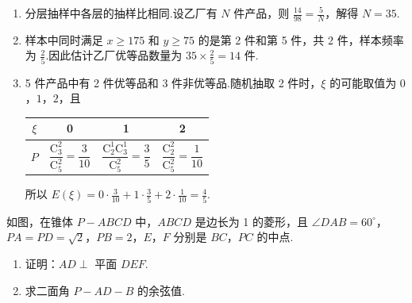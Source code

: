 \begin{solution}
\begin{enumerate}
\item 分层抽样中各层的抽样比相同.设乙厂有 \(N\) 件产品，则 \(\frac{14}{98}=\frac{5}{N}\)，解得 \(N=35\).
\item 样本中同时满足 \(x\geqslant175\) 和 \(y\geqslant75\) 的是第 2 件和第 5 件，共 2 件，样本频率为 \(\frac25\).因此估计乙厂优等品数量为 \(35\times\frac25=14\) 件.
\item 5 件产品中有 2 件优等品和 3 件非优等品.随机抽取 2 件时，\(\xi\) 的可能取值为 \(0\)，\(1\)，\(2\)，且
\begin{center}
\begin{tabular}{c|ccc}
\hline
\(\xi\) & 0 & 1 & 2 \\
\hline
\(P\) & \(\dfrac{\mathrm C_3^2}{\mathrm C_5^2}=\dfrac3{10}\) & \(\dfrac{\mathrm C_2^1\mathrm C_3^1}{\mathrm C_5^2}=\dfrac35\) & \(\dfrac{\mathrm C_2^2}{\mathrm C_5^2}=\dfrac1{10}\) \\
\hline
\end{tabular}
\end{center}
所以 \(E(\xi)=0\cdot\frac3{10}+1\cdot\frac35+2\cdot\frac1{10}=\frac45\).
\end{enumerate}
\end{solution}

\begin{problem}
如图，在锥体 \(P - ABCD\) 中，\(ABCD\) 是边长为 1 的菱形，且 \(\angle DAB = 60^{\circ}\)，\(PA = PD = \sqrt{2}\)，\(PB = 2\)，\(E\)，\(F\) 分别是 \(BC\)，\(PC\) 的中点.

\begin{enumerate}
\item 证明：\(AD \perp\) 平面 \(DEF\).
\item 求二面角 \(P-AD-B\) 的余弦值.
\end{enumerate}

\end{problem}

